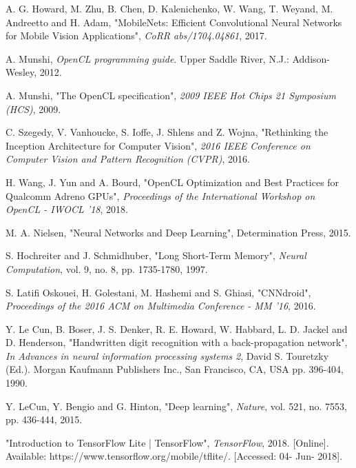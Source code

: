 %
% 

% 
% 
\begin{thebibliography}{4}
{A. G. Howard, M. Zhu, B. Chen, D. Kalenichenko, W. Wang, T. Weyand, M. Andreetto and H. Adam, "MobileNets: Efficient Convolutional Neural Networks for Mobile Vision Applications", \textit{CoRR abs/1704.04861}, 2017.}	

{A. Munshi, \textit{OpenCL programming guide}. Upper Saddle River, N.J.: Addison-Wesley, 2012.}

{A. Munshi, "The OpenCL specification", \textit{2009 IEEE Hot Chips 21 Symposium (HCS)}, 2009.}

{C. Szegedy, V. Vanhoucke, S. Ioffe, J. Shlens and Z. Wojna, "Rethinking the Inception Architecture for Computer Vision", \textit{2016 IEEE Conference on Computer Vision and Pattern Recognition (CVPR)}, 2016.}

{H. Wang, J. Yun and A. Bourd, "OpenCL Optimization and Best Practices for Qualcomm Adreno GPUs", \textit{Proceedings of the International Workshop on OpenCL - IWOCL '18}, 2018.}

{M. A. Nielsen, "Neural Networks and Deep Learning", Determination Press, 2015.}

{S. Hochreiter and J. Schmidhuber, "Long Short-Term Memory", \textit{Neural Computation}, vol. 9, no. 8, pp. 1735-1780, 1997.}

{S. Latifi Oskouei, H. Golestani, M. Hashemi and S. Ghiasi, "CNNdroid", \textit{Proceedings of the 2016 ACM on Multimedia Conference - MM '16}, 2016.}

{Y. Le Cun, B. Boser, J. S. Denker, R. E. Howard, W. Habbard, L. D. Jackel and D. Henderson, "Handwritten digit recognition with a back-propagation network", \textit{In Advances in neural information processing systems 2},  David S. Touretzky (Ed.). Morgan Kaufmann Publishers Inc., San Francisco, CA, USA pp. 396-404, 1990.}

{Y. LeCun, Y. Bengio and G. Hinton, "Deep learning", \textit{Nature}, vol. 521, no. 7553, pp. 436-444, 2015.}

{"Introduction to TensorFlow Lite  |  TensorFlow", \textit{TensorFlow}, 2018. [Online]. Available: https://www.tensorflow.org/mobile/tflite/. [Accessed: 04- Jun- 2018].}


\end{thebibliography}
